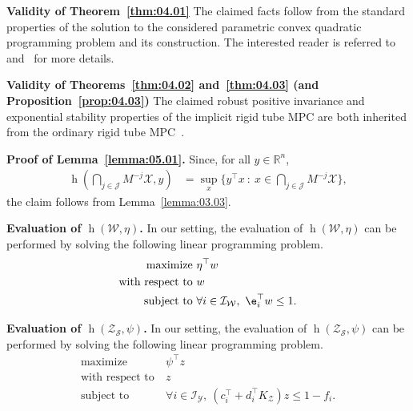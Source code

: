 \documentclass[twocolumn]{autart}
\newcommand{\mb}[1]{\mathbb{#1}}
\newcommand{\mc}[1]{\mathcal{#1}}
\newcommand{\R}{\mb{R}}
\newcommand{\support}[2]{\operatorname{h}(#1,#2)}
\numberwithin{equation}{section}
\begin{document}
\textbf{Validity of Theorem~\ref{thm:04.01}}
The claimed facts follow from the standard properties of the solution to the considered parametric convex quadratic programming problem and its construction. The interested reader is referred to~\cite{rockafellar:wets:2009} and~\cite{mayne:seron:rakovic:2005,rawlings:mayne:2009} for more details.


\textbf{Validity of Theorems~\ref{thm:04.02} and~\ref{thm:04.03} (and Proposition~\ref{prop:04.03})}
The claimed robust positive invariance and exponential stability properties of the implicit rigid tube MPC are both inherited from the ordinary rigid tube MPC~\cite{mayne:seron:rakovic:2005}.

\textbf{Proof of Lemma~\ref{lemma:05.01}.}  Since, for all $y\in\R^n$,
\begin{align*}
\support{\bigcap_{j\in\mc{J}} M^{-j}\mc{X}}{y}&=\sup_{x}\{y^\top x\ :\  x\in  \bigcap_{j\in\mc{J}} M^{-j}\mc{X}\},
\end{align*}
the claim follows from Lemma~\ref{lemma:03.03}.

\textbf{Evaluation of $\support{\mc{W}}{\eta}$.} In our setting, the evaluation of  $\support{\mc{W}}{\eta}$ can be performed by solving the following linear programming problem.
\begin{align*}
\text{maximize}\ &\eta^\top w\\
\text{with respect to}\ &w\\
\text{subject to}\ & \forall i\in\mc{I}_{\mc{W}},\ \e_i^\top w\le 1.
\end{align*}


\textbf{Evaluation of $\support{\mc{Z}_\mc{S}}{\psi}$.} In our setting, the evaluation of  $\support{\mc{Z}_\mc{S}}{\psi}$ can be performed by solving the following linear programming problem.
\begin{align*}
\text{maximize}\ &\psi^\top z\\
\text{with respect to}\ &z\\
\text{subject to}\ &  \forall i\in\mc{I}_\mc{Y},\  (c_i^\top + d_i^\top K_\mc{Z})z \le 1-f_i.
\end{align*}



\end{document}
